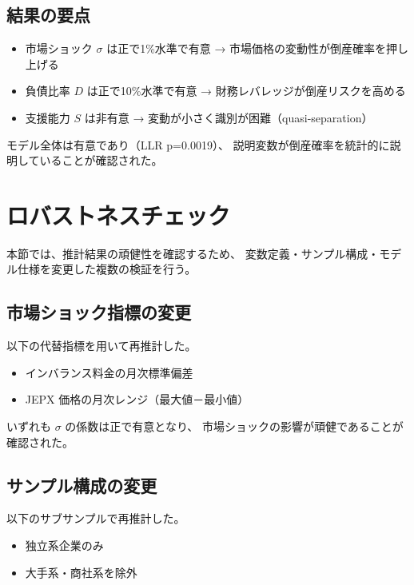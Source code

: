 \subsection{結果の要点}

\begin{itemize}
  \item 市場ショック $\sigma$ は正で1\%水準で有意  
        → 市場価格の変動性が倒産確率を押し上げる
  \item 負債比率 $D$ は正で10\%水準で有意  
        → 財務レバレッジが倒産リスクを高める
  \item 支援能力 $S$ は非有意  
        → 変動が小さく識別が困難（quasi-separation）
\end{itemize}

モデル全体は有意であり（LLR p=0.0019）、
説明変数が倒産確率を統計的に説明していることが確認された。

\section{ロバストネスチェック}
\label{sec:robustness}

本節では、推計結果の頑健性を確認するため、
変数定義・サンプル構成・モデル仕様を変更した複数の検証を行う。

\subsection{市場ショック指標の変更}

以下の代替指標を用いて再推計した。

\begin{itemize}
  \item インバランス料金の月次標準偏差
  \item JEPX 価格の月次レンジ（最大値－最小値）
\end{itemize}

いずれも $\sigma$ の係数は正で有意となり、
市場ショックの影響が頑健であることが確認された。

\subsection{サンプル構成の変更}

以下のサブサンプルで再推計した。

\begin{itemize}
  \item 独立系企業のみ
  \item 大手系・商社系を除外
\end{itemize}

